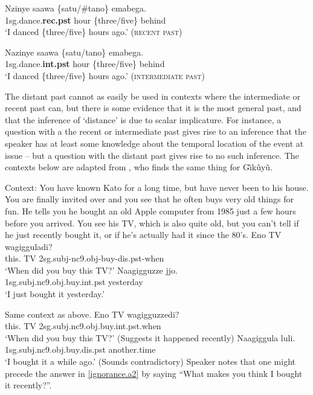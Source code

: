 \documentclass[output=paper,
modfonts
]{langscibook}
\begin{document}
\ea\label{ex10}
\gll Nzinye saawa \{satu/\#tano\} emabega. \\
{\sc1sg}.dance{\sc.\textbf{rec.pst}} hour \{three/five\} behind \\
\glt `I danced \{three/five\} hours ago.' \hfill (\textsc{recent past})
\z

\ea\label{ex11}
\gll Nazinye saawa  \{satu/tano\} emabega. \\
{\sc 1sg}.dance{\sc.\textbf{int.pst}} hour \{three/five\} behind \\
\glt `I danced \{three/five\} hours ago.' \hfill (\textsc{intermediate past})
\z


 The distant past cannot as easily be used in contexts where the intermediate or recent past can, but there is some evidence that it is the most general past, and that the inference of `distance' is due to scalar implicature.
 For instance, a question with a the recent or intermediate past gives rise to an inference that the speaker has at least some knowledge about the temporal location of the event at issue -- but a question with the distant past gives rise to no such inference.
 The contexts below are adapted from \citet{cable12beyond}, who finds the same thing for G\~\i k\~uy\~u.
 

\ea
Context: You have known Kato for a long time, but have never been to his house. You are finally invited over and you see that he often buys very old things for fun. He tells you he bought an old Apple computer from 1985 just a few hours before you arrived. You see his TV, which is also quite old, but you can't tell if he just recently bought it, or if he's actually had it since the 80's. 
  \ea\label{ignorance.q}
  \gll  Eno TV wagigguladi? \\
  this. TV {\sc 2sg.subj-nc9.obj}-buy{\sc-dis.pst}-when \\
  \glt `When did you buy this TV?' 
  \ex\label{ignorance.a}
  \gll  Naagigguzze jjo. \\
  {\sc 1sg.subj.nc9.obj}.buy{\sc.int.pst} yesterday \\
  \glt `I just bought it yesterday.'
  \z
\z


\ea
Same context as above.
  \ea\label{ignorance.q2}
  \gll  Eno TV wagigguzzedi? \\
  this. TV {\sc 2sg.subj.nc9.obj}.buy{\sc.int.pst}.when \\
  \glt `When did you buy this TV?' (Suggests it happened recently)
  \ex\label{ignorance.a2}
  \gll  Naagiggula luli. \\
  {\sc 1sg.subj.nc9.obj}.buy{\sc.dis.pst} another.time \\
  \glt `I bought it a while ago.' (Sounds contradictory)
  \ex Speaker notes that one might precede the answer in \ref{ignorance.a2} by saying ``What makes you think I bought it recently?''.
  \z
\z
\end{document}
